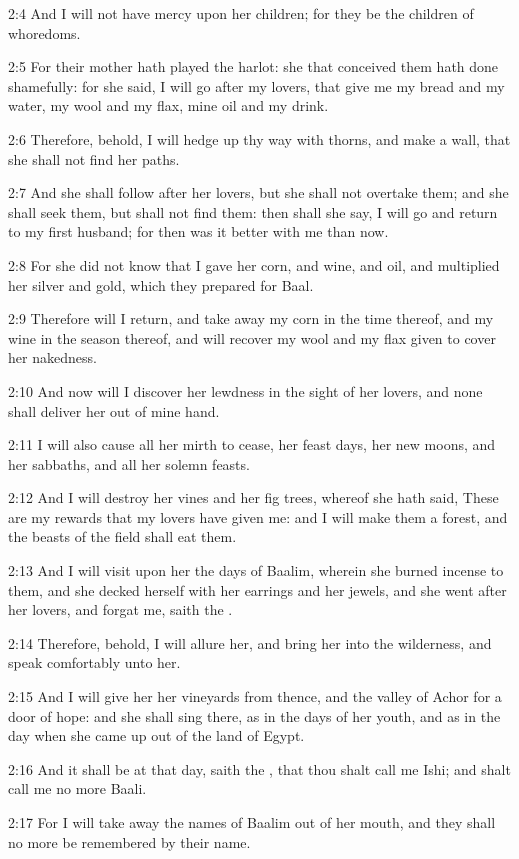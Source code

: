 2:4 And I will not have mercy upon her children; for they be the
children of whoredoms.

2:5 For their mother hath played the harlot: she that conceived them
hath done shamefully: for she said, I will go after my lovers, that
give me my bread and my water, my wool and my flax, mine oil and my
drink.

2:6 Therefore, behold, I will hedge up thy way with thorns, and make a
wall, that she shall not find her paths.

2:7 And she shall follow after her lovers, but she shall not overtake
them; and she shall seek them, but shall not find them: then shall she
say, I will go and return to my first husband; for then was it better
with me than now.

2:8 For she did not know that I gave her corn, and wine, and oil, and
multiplied her silver and gold, which they prepared for Baal.

2:9 Therefore will I return, and take away my corn in the time
thereof, and my wine in the season thereof, and will recover my wool
and my flax given to cover her nakedness.

2:10 And now will I discover her lewdness in the sight of her lovers,
and none shall deliver her out of mine hand.

2:11 I will also cause all her mirth to cease, her feast days, her new
moons, and her sabbaths, and all her solemn feasts.

2:12 And I will destroy her vines and her fig trees, whereof she hath
said, These are my rewards that my lovers have given me: and I will
make them a forest, and the beasts of the field shall eat them.

2:13 And I will visit upon her the days of Baalim, wherein she burned
incense to them, and she decked herself with her earrings and her
jewels, and she went after her lovers, and forgat me, saith the \LORD.

2:14 Therefore, behold, I will allure her, and bring her into the
wilderness, and speak comfortably unto her.

2:15 And I will give her her vineyards from thence, and the valley of
Achor for a door of hope: and she shall sing there, as in the days of
her youth, and as in the day when she came up out of the land of
Egypt.

2:16 And it shall be at that day, saith the \LORD, that thou shalt call
me Ishi; and shalt call me no more Baali.

2:17 For I will take away the names of Baalim out of her mouth, and
they shall no more be remembered by their name.

